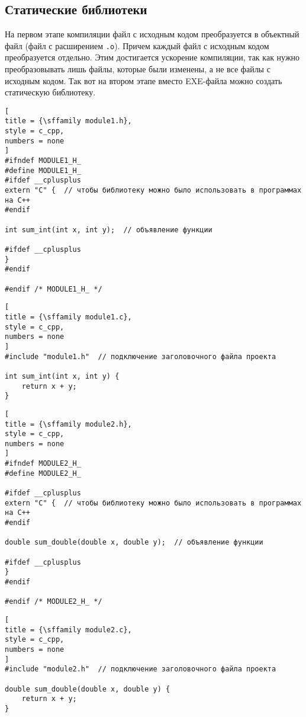 \documentclass[%
	11pt,
	a4paper,
	utf8,
		]{article}
\begin{document}
\subsection{Статические библиотеки}

На первом этапе компиляции файл с исходным кодом преобразуется в объектный файл (файл с расширением \verb|.o|). Причем каждый файл с исходным кодом преобразуется отдельно. Этим достигается ускорение компиляции, так как нужно преобразовывать лишь файлы, которые были изменены, а не все файлы с исходным кодом. Так вот на втором этапе вместо EXE-файла можно создать статическую библиотеку.

\begin{lstlisting}[
title = {\sffamily module1.h},
style = c_cpp,
numbers = none	
]
#ifndef MODULE1_H_
#define MODULE1_H_
#ifdef __cplusplus
extern "C" {  // чтобы библиотеку можно было использовать в программах на C++
#endif

int sum_int(int x, int y);  // объявление функции

#ifdef __cplusplus
}
#endif

#endif /* MODULE1_H_ */
\end{lstlisting}

\begin{lstlisting}[
title = {\sffamily module1.c},
style = c_cpp,
numbers = none
]
#include "module1.h"  // подключение заголовочного файла проекта

int sum_int(int x, int y) {
    return x + y;
}
\end{lstlisting}

\begin{lstlisting}[
title = {\sffamily module2.h},
style = c_cpp,
numbers = none
]
#ifndef MODULE2_H_
#define MODULE2_H_

#ifdef __cplusplus
extern "C" {  // чтобы библиотеку можно было использовать в программах на C++
#endif

double sum_double(double x, double y);  // объявление функции

#ifdef __cplusplus
}
#endif

#endif /* MODULE2_H_ */
\end{lstlisting}

\begin{lstlisting}[
title = {\sffamily module2.c},
style = c_cpp,
numbers = none
]
#include "module2.h"  // подключение заголовочного файла проекта

double sum_double(double x, double y) {
    return x + y;
}
\end{lstlisting}
\end{document}
